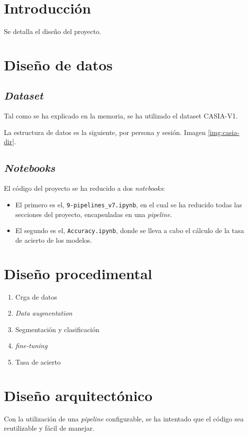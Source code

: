
\section{Introducción}

Se detalla el diseño del proyecto.

\section{Diseño de datos}

\subsection{\textit{Dataset}}

Tal como se ha explicado en la memoria, se ha utilizado el dataset CASIA-V1.

La estructura de datos es la siguiente, por persona y sesión. Imagen \ref{img:casia-dir}.


\subsection{\textit{Notebooks}}

El código del proyecto se ha reducido a dos \textit{notebooks}:


\begin{itemize}
    \item El primero es el, \texttt{9-pipelines\_v7.ipynb}, en el cual se ha reducido todas las secciones del proyecto, encapsuladas en una \textit{pipeline}.
    \item El segundo es el, \texttt{Accuracy.ipynb}, donde se lleva a cabo el cálculo de la tasa de acierto de los modelos.
\end{itemize}


\section{Diseño procedimental}

\begin{enumerate}
    \item Crga de datos
    \item \textit{Data augmentation}
    \item Segmentación y clasificación
    \item \textit{fine-tuning}
    \item Tasa de acierto
    \end{enumerate}

\section{Diseño arquitectónico}

Con la utilización de una \textit{pipeline} configurable, se ha intentado que el código sea reutilizable y fácil de manejar.
